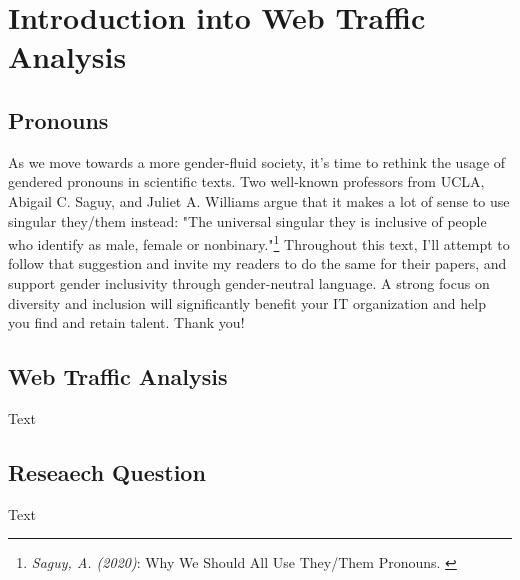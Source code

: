 %
%

\pagebreak
\section{Introduction into Web Traffic Analysis}

\onehalfspacing

\subsection{Pronouns}

As we move towards a more gender-fluid society, it's time to rethink the usage of gendered pronouns in scientific texts. Two well-known professors from UCLA, Abigail C. Saguy, and Juliet A. Williams argue that it makes a lot of sense to use singular they/them instead: "The universal singular they is inclusive of people who identify as male, female or nonbinary."\footnote{\textit{Saguy, A. (2020)}: Why We Should All Use They/Them Pronouns. \cite{pronouns}} Throughout this text, I'll attempt to follow that suggestion and invite my readers to do the same for their papers, and support gender inclusivity through gender-neutral language. A strong focus on diversity and inclusion will significantly benefit your IT organization and help you find and retain talent. Thank you!

\subsection{Web Traffic Analysis}

Text

\subsection{Reseaech Question}

Text
